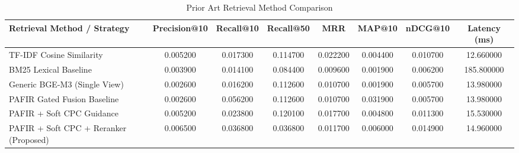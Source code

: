 \begin{table}
\caption{Prior Art Retrieval Method Comparison}
\label{tab:retrieval_comp}
\begin{tabular}{lccccccc}
\toprule
Retrieval Method / Strategy & Precision@10 & Recall@10 & Recall@50 & MRR & MAP@10 & nDCG@10 & Latency (ms) \\
\midrule
TF-IDF Cosine Similarity & 0.005200 & 0.017300 & 0.114700 & 0.022200 & 0.004400 & 0.010700 & 12.660000 \\
BM25 Lexical Baseline & 0.003900 & 0.014100 & 0.084400 & 0.009600 & 0.001900 & 0.006200 & 185.800000 \\
Generic BGE-M3 (Single View) & 0.002600 & 0.016200 & 0.112600 & 0.010700 & 0.001900 & 0.005700 & 13.980000 \\
PAFIR Gated Fusion Baseline & 0.002600 & 0.056200 & 0.112600 & 0.010700 & 0.031900 & 0.005700 & 13.980000 \\
PAFIR + Soft CPC Guidance & 0.005200 & 0.023800 & 0.120100 & 0.017700 & 0.004800 & 0.011300 & 15.530000 \\
PAFIR + Soft CPC + Reranker (Proposed) & 0.006500 & 0.036800 & 0.036800 & 0.011700 & 0.006000 & 0.014900 & 14.960000 \\
\bottomrule
\end{tabular}
\end{table}
